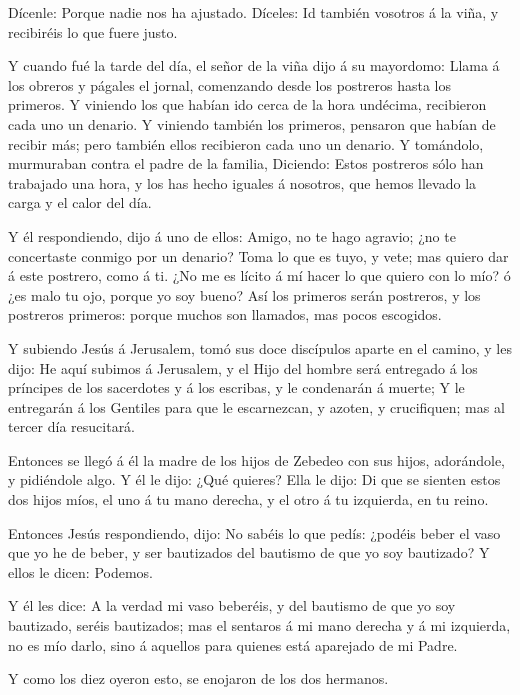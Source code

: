  Dícenle: Porque nadie nos ha ajustado. Díceles: Id también
vosotros á la viña, y recibiréis lo que fuere justo.

 Y cuando fué la tarde del día, el señor de la viña dijo á
su mayordomo: Llama á los obreros y págales el jornal, comenzando desde
los postreros hasta los primeros.  Y viniendo los que habían
ido cerca de la hora undécima, recibieron cada uno un denario.
 Y viniendo también los primeros, pensaron que habían de
recibir más; pero también ellos recibieron cada uno un denario.
 Y tomándolo, murmuraban contra el padre de la familia,
 Diciendo: Estos postreros sólo han trabajado una hora, y
los has hecho iguales á nosotros, que hemos llevado la carga y el calor
del día.

 Y él respondiendo, dijo á uno de ellos: Amigo, no te hago
agravio; ¿no te concertaste conmigo por un denario?  Toma
lo que es tuyo, y vete; mas quiero dar á este postrero, como á ti.
 ¿No me es lícito á mí hacer lo que quiero con lo mío? ó
¿es malo tu ojo, porque yo soy bueno?  Así los primeros
serán postreros, y los postreros primeros: porque muchos son llamados,
mas pocos escogidos.

 Y subiendo Jesús á Jerusalem, tomó sus doce discípulos
aparte en el camino, y les dijo:  He aquí subimos á
Jerusalem, y el Hijo del hombre será entregado á los príncipes de los
sacerdotes y á los escribas, y le condenarán á muerte;  Y
le entregarán á los Gentiles para que le escarnezcan, y azoten, y
crucifiquen; mas al tercer día resucitará.

 Entonces se llegó á él la madre de los hijos de Zebedeo
con sus hijos, adorándole, y pidiéndole algo.  Y él le
dijo: ¿Qué quieres? Ella le dijo: Di que se sienten estos dos hijos
míos, el uno á tu mano derecha, y el otro á tu izquierda, en tu reino.

 Entonces Jesús respondiendo, dijo: No sabéis lo que pedís:
¿podéis beber el vaso que yo he de beber, y ser bautizados del bautismo
de que yo soy bautizado? Y ellos le dicen: Podemos.

 Y él les dice: A la verdad mi vaso beberéis, y del
bautismo de que yo soy bautizado, seréis bautizados; mas el sentaros á
mi mano derecha y á mi izquierda, no es mío darlo, sino á aquellos para
quienes está aparejado de mi Padre.

 Y como los diez oyeron esto, se enojaron de los dos
hermanos.


